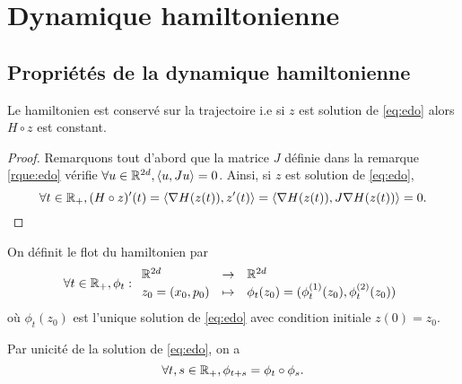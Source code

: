 \documentclass[10pt,a4paper]{article}
\begin{document}


\section{Dynamique hamiltonienne}

\subsection{Propriétés de la dynamique hamiltonienne}
\begin{Prop}\label{prop:conservation}
	Le hamiltonien est conservé sur la trajectoire i.e si $z$ est solution de \eqref{eq:edo} alors $H \circ z$ est constant.
\end{Prop}

\begin{proof}
	Remarquons tout d'abord que la matrice $J$ définie dans la remarque \ref{rque:edo} vérifie $\forall u \in \mathbb{R}^{2d}, { \left\langle u, Ju \right\rangle} = 0$. Ainsi, si $z$ est solution de \eqref{eq:edo},
	$$
	\forall t \in \mathbb{R}_+, (H \circ z)'(t) = { \left\langle \nabla H (z(t)), z'(t) \right\rangle} = { \left\langle \nabla H (z(t)), J \nabla H(z(t)) \right\rangle} = 0.
	$$
\end{proof}

\begin{Def}
	On définit le flot du hamiltonien par
	$$
	\forall t \in \mathbb{R}_+, \phi_t : { \begin{array}{lcl} 
		\mathbb{R}^{2d} & \to & \mathbb{R}^{2d} \\
		z_0 = (x_0, p_0) &\mapsto & \phi_t(z_0) = (\phi_t^{(1)}(z_0), \phi_t^{(2)}(z_0))
	 \end{array} }
	$$
	où $\phi_t(z_0)$ est l'unique solution de \eqref{eq:edo} avec condition initiale $z(0) = z_0$.
\end{Def}

\begin{Pte}
	Par unicité de la solution de \eqref{eq:edo}, on a
	$$
	\forall t, s \in \mathbb{R}_+, \phi_{t+s} = \phi_t \circ \phi_s.
	$$
\end{Pte}
\end{document}
